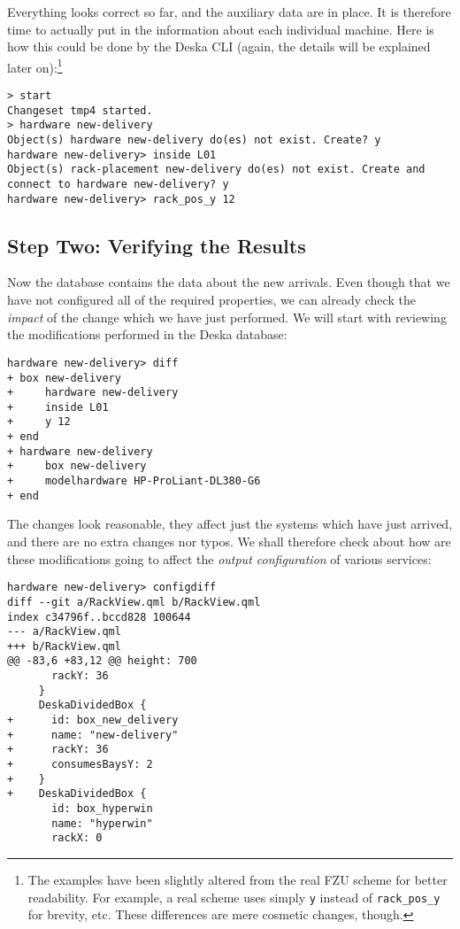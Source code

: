 \documentclass[deska]{subfiles}
\begin{document}
Everything looks correct so far, and the auxiliary data are in place.  It is therefore time to actually put in the
information about each individual machine.  Here is how this could be done by the Deska CLI (again, the details will be
explained later on):\footnote{The examples have been slightly altered from the real FZU scheme for better readability.
For example, a real scheme uses simply {\tt y} instead of {\tt rack\_pos\_y} for brevity, etc.  These differences are
mere cosmetic changes, though.}

\begin{verbatim}
> start
Changeset tmp4 started.
> hardware new-delivery
Object(s) hardware new-delivery do(es) not exist. Create? y
hardware new-delivery> inside L01
Object(s) rack-placement new-delivery do(es) not exist. Create and connect to hardware new-delivery? y
hardware new-delivery> rack_pos_y 12
\end{verbatim}

\subsection{Step Two: Verifying the Results}

Now the database contains the data about the new arrivals.  Even though that we have not configured all of the required
properties, we can already check the {\em impact} of the change which we have just performed.  We will start with
reviewing the modifications performed in the Deska database:

\begin{verbatim}
hardware new-delivery> diff
+ box new-delivery
+     hardware new-delivery
+     inside L01
+     y 12
+ end
+ hardware new-delivery
+     box new-delivery
+     modelhardware HP-ProLiant-DL380-G6
+ end
\end{verbatim}

The changes look reasonable, they affect just the systems which have just arrived, and there are no extra changes nor
typos.  We shall therefore check about how are these modifications going to affect the {\em output configuration} of
various services:

\begin{verbatim}
hardware new-delivery> configdiff
diff --git a/RackView.qml b/RackView.qml
index c34796f..bccd828 100644
--- a/RackView.qml
+++ b/RackView.qml
@@ -83,6 +83,12 @@ height: 700
       rackY: 36
     }
     DeskaDividedBox {
+      id: box_new_delivery
+      name: "new-delivery"
+      rackY: 36
+      consumesBaysY: 2
+    }
+    DeskaDividedBox {
       id: box_hyperwin
       name: "hyperwin"
       rackX: 0
\end{verbatim}
\end{document}
